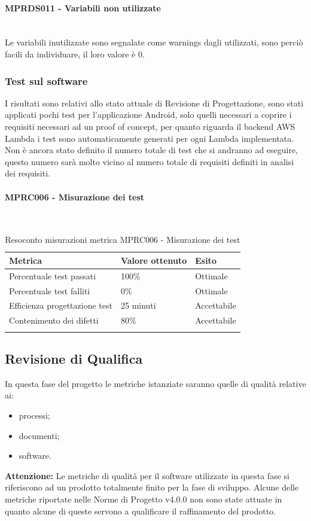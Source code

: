 \paragraph{MPRDS011 - Variabili non utilizzate}\mbox{}\\[0.4cm]
Le variabili inutilizzate sono segnalate come warnings dagli  utilizzati, sono perciò facili da individuare, il loro valore è 0.
\subsubsection{Test sul software}
I risultati sono relativi allo stato attuale di Revisione di Progettazione, sono stati applicati pochi test per l'applicazione Android, solo quelli necessari a coprire i requisiti necessari ad un proof of concept, per quanto riguarda il backend AWS Lambda i test sono automaticamente generati per ogni Lambda implementata. Non è ancora stato definito il numero totale di test che si andranno ad eseguire, questo numero sarà molto vicino al numero totale di requisiti definiti in analisi dei requisiti.
\paragraph{MPRC006 - Misurazione dei test}\mbox{}\\[0.4cm]
\begin{center}
	\centering
	\renewcommand{\arraystretch}{1.5}
	\begin{longtable}{  p{5cm}  p{5cm} p{3cm}  }
		\rowcolor{tableHeadYellow}
		\textbf{Metrica}   & \textbf{Valore ottenuto} & \textbf{Esito} \\ 
		\endhead
		Percentuale test passati     & 100\%  & Ottimale \\
		Percentuale test falliti     & 0\% & Ottimale \\
		Efficienza progettazione test    & 25 minuti & Accettabile \\
		Contenimento dei difetti    & 80\% & Accettabile \\
		\rowcolor{white}
		\caption{Resoconto misurazioni metrica MPRC006 - Misurazione dei test}
	\end{longtable}
\end{center}

\clearpage
\subsection{Revisione di Qualifica}
\label{sec:revisione_qualifica}
In questa fase del progetto le metriche istanziate saranno quelle di qualità relative ai:
\begin{itemize}
	\item processi;
	\item documenti;
	\item software.
\end{itemize}
\textbf{Attenzione:} Le metriche di qualità per il software utilizzate in questa fase si riferiscono ad un prodotto totalmente finito per la fase di sviluppo. Alcune delle metriche riportate nelle Norme di Progetto v4.0.0 non sono state attuate in quanto alcune di queste servono a qualificare il raffinamento del prodotto.
